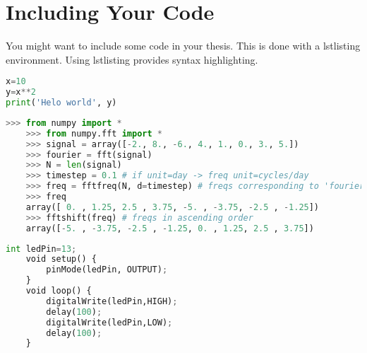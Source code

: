 \chapter{Including Your Code} \label{AppendixCode}
\label{app:Talk}

You might want to include some code in your thesis. This is done with a lstlisting environment. Using lstlisting provides syntax highlighting. 

\begin{lstlisting}[language=Python] 
x=10
y=x**2
print('Helo world', y)
\end{lstlisting}

	\begin{lstlisting}[language=Python]
	>>> from numpy import *
	>>> from numpy.fft import *
	>>> signal = array([-2., 8., -6., 4., 1., 0., 3., 5.])
	>>> fourier = fft(signal)
	>>> N = len(signal)
	>>> timestep = 0.1 # if unit=day -> freq unit=cycles/day
	>>> freq = fftfreq(N, d=timestep) # freqs corresponding to 'fourier'
	>>> freq
	array([ 0. , 1.25, 2.5 , 3.75, -5. , -3.75, -2.5 , -1.25])
	>>> fftshift(freq) # freqs in ascending order
	array([-5. , -3.75, -2.5 , -1.25, 0. , 1.25, 2.5 , 3.75])
\end{lstlisting}

\begin{lstlisting}[language=Python] 
	int ledPin=13;
	void setup() {
		pinMode(ledPin, OUTPUT);
	}
	void loop() {
		digitalWrite(ledPin,HIGH);
		delay(100);
		digitalWrite(ledPin,LOW);
		delay(100);
	}
\end{lstlisting}

